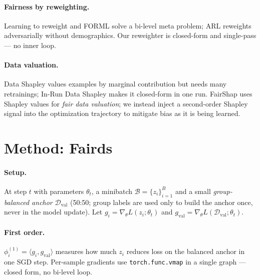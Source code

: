 \documentclass[letterpaper]{article}
\begin{document}
\paragraph{Fairness by reweighting.}
Learning to reweight \citep{ren2018reweight} and FORML \citep{yan2022forml} solve
a bi-level meta problem; ARL \citep{lahoti2020arl} reweights adversarially without
demographics. Our reweighter is closed-form and single-pass --- no inner loop.

\paragraph{Data valuation.}
Data Shapley \citep{ghorbani2019datashapley} values examples by marginal
contribution but needs many retrainings; In-Run Data Shapley \citep{wang2024inrun}
makes it closed-form in one run. FairShap \citep{arnaiz2023fairshap} uses Shapley
values for \emph{fair data valuation}; we instead inject a second-order Shapley
signal into the optimization trajectory to mitigate bias as it is being learned.

\section{Method: Fairds}
\label{sec:method}

\paragraph{Setup.}
At step $t$ with parameters $\theta_t$, a minibatch $\mathcal{B}=\{z_i\}_{i=1}^B$
and a small \emph{group-balanced anchor} $\mathcal{D}_{\mathrm{val}}$ (50:50;
group labels are used only to build the anchor once, never in the model update).
Let $g_i=\nabla_\theta L(z_i;\theta_t)$ and
$g_{\mathrm{val}}=\nabla_\theta L(\mathcal{D}_{\mathrm{val}};\theta_t)$.

\paragraph{First order.}
$\phi_i^{(1)}=\langle g_i,g_{\mathrm{val}}\rangle$ \citep{wang2024inrun} measures
how much $z_i$ reduces loss on the balanced anchor in one SGD step. Per-sample
gradients use \texttt{torch.func.vmap} in a single graph --- closed form, no
bi-level loop.
\end{document}
